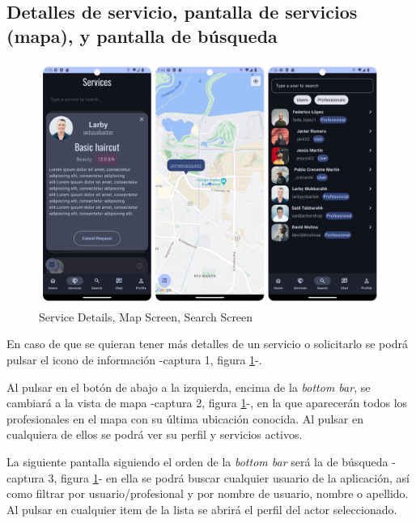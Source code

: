 \subsection{Detalles de servicio, pantalla de servicios (mapa), y pantalla de búsqueda}
\begin{figure}[h]
	\centering
	\includegraphics[width = 1\textwidth]{Imagenes/capturasApp/detail_map_search.png}
	\caption{Service Details, Map Screen, Search Screen}
	\label{fig:capApp3}
\end{figure}

En caso de que se quieran tener más detalles de un servicio o solicitarlo se podrá pulsar el icono de información -captura 1, figura \ref{fig:capApp3}-.

Al pulsar en el botón de abajo a la izquierda, encima de la \textit{bottom bar}, se cambiará a la vista de mapa -captura 2, figura \ref{fig:capApp3}-, en la que aparecerán todos los profesionales en el mapa con su última ubicación conocida. Al pulsar en cualquiera de ellos se podrá ver su perfil y servicios activos.

La siguiente pantalla siguiendo el orden de la \textit{bottom bar} será la de búsqueda -captura 3, figura \ref{fig:capApp3}- en ella se podrá buscar cualquier usuario de la aplicación, así como filtrar por usuario/profesional y por nombre de usuario, nombre o apellido. Al pulsar en cualquier item de la lista se abrirá el perfil del actor seleccionado.
\newpage
